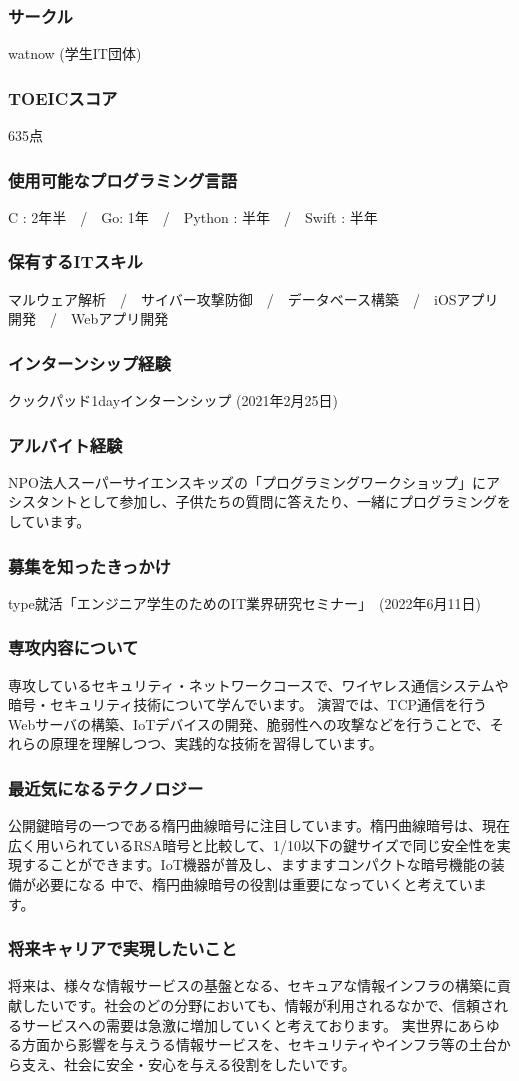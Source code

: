 \documentclass[dvipdfmx,autodetect-engine]{jsarticle}
\begin{document}
\subsubsection*{サークル}
watnow (学生IT団体)

\subsubsection*{TOEICスコア}
635点

\subsubsection*{使用可能なプログラミング言語}
C : 2年半　/　Go: 1年　/　Python : 半年　/　Swift : 半年
\subsubsection*{保有するITスキル}
マルウェア解析　/　サイバー攻撃防御　/　データベース構築　/　iOSアプリ開発　/　Webアプリ開発
\subsubsection*{インターンシップ経験}
クックパッド1dayインターンシップ (2021年2月25日)
\subsubsection*{アルバイト経験}
NPO法人スーパーサイエンスキッズの「プログラミングワークショップ」にアシスタントとして参加し、子供たちの質問に答えたり、一緒にプログラミングをしています。
\subsubsection*{募集を知ったきっかけ}
type就活「エンジニア学生のためのIT業界研究セミナー」　(2022年6月11日)
\subsubsection*{専攻内容について}
専攻しているセキュリティ・ネットワークコースで、ワイヤレス通信システムや暗号・セキュリティ技術について学んでいます。
演習では、TCP通信を行うWebサーバの構築、IoTデバイスの開発、脆弱性への攻撃などを行うことで、それらの原理を理解しつつ、実践的な技術を習得しています。
\subsubsection*{最近気になるテクノロジー}
公開鍵暗号の一つである楕円曲線暗号に注目しています。楕円曲線暗号は、現在広く用いられているRSA暗号と比較して、1/10以下の鍵サイズで同じ安全性を実現することができます。IoT機器が普及し、ますますコンパクトな暗号機能の装備が必要になる
中で、楕円曲線暗号の役割は重要になっていくと考えています。
\subsubsection*{将来キャリアで実現したいこと}
将来は、様々な情報サービスの基盤となる、セキュアな情報インフラの構築に貢献したいです。社会のどの分野においても、情報が利用されるなかで、信頼されるサービスへの需要は急激に増加していくと考えております。
実世界にあらゆる方面から影響を与えうる情報サービスを、セキュリティやインフラ等の土台から支え、社会に安全・安心を与える役割をしたいです。
\end{document}
